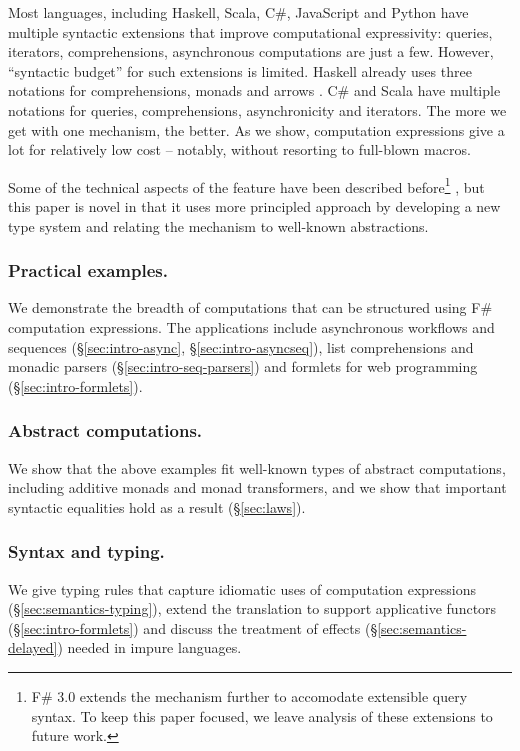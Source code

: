 \documentclass[runningheads,a4paper]{llncs}
\begin{document}
Most languages, including Haskell, Scala, C\#, JavaScript and Python have multiple
syntactic extensions that improve computational expressivity: queries, 
iterators, comprehensions, asynchronous computations are just a few. However,
``syntactic budget'' for such extensions is limited. Haskell already uses three notations
for comprehensions, monads and arrows \cite{arrows}. C\# and Scala have multiple notations
for queries, comprehensions, asynchronicity and iterators. The more we get with one 
mechanism, the better. As we show, computation expressions give a lot for relatively 
low cost -- notably, without resorting to full-blown macros.

Some of the technical aspects of the feature have been described before\footnote{F\# 3.0 extends the 
mechanism further to accomodate extensible query syntax. To keep this paper focused, we leave analysis 
of these extensions to future work.} \cite{fsharp-spec}, but this paper is novel in that it 
uses more principled approach by developing a new type system and relating the mechanism to
well-known abstractions.

\vspace{-1em}
\subsubsection{Practical examples.} 
We demonstrate the breadth of computations that can be structured using F\# computation expressions.
The applications include asynchronous workflows and sequences (\S\ref{sec:intro-async}, 
\S\ref{sec:intro-asyncseq}), list comprehensions and monadic parsers (\S\ref{sec:intro-seq-parsers})
and formlets for web programming (\S\ref{sec:intro-formlets}).

\vspace{-1em}
\subsubsection{Abstract computations.} We show that the above examples fit well-known types
of abstract computations, including additive monads and monad transformers, and we show that 
important syntactic equalities hold as a result (\S\ref{sec:laws}).

\vspace{-1em}
\subsubsection{Syntax and typing.} We give typing rules that capture idiomatic uses of computation
expressions (\S\ref{sec:semantics-typing}), extend the translation to support applicative functors 
(\S\ref{sec:intro-formlets}) and discuss the treatment of effects (\S\ref{sec:semantics-delayed}) 
needed in impure languages.
\end{document}
